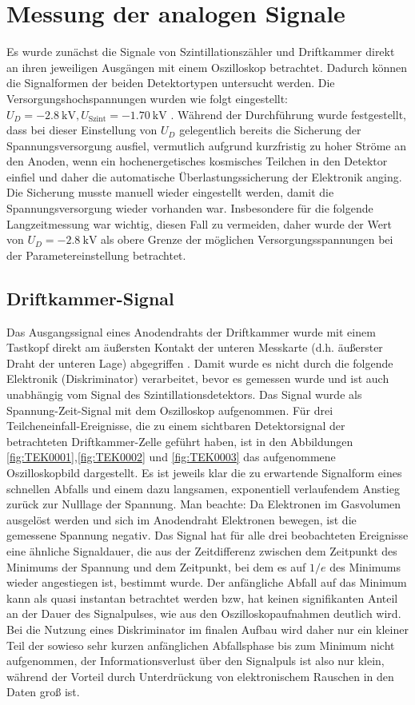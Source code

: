 \chapter{Messung der analogen Signale}\label{sec:analog}

Es wurde zunächst die Signale von Szintillationszähler und Driftkammer direkt an ihren jeweiligen Ausgängen mit einem Oszilloskop betrachtet. Dadurch können die Signalformen der beiden Detektortypen untersucht werden. Die Versorgungshochspannungen wurden wie folgt eingestellt: $U_D=\SI{-2.8}{\kilo\V}, U_\text{Szint}=\SI{-1.70}{\kilo\V}$ \cite[2]{515versuchsanleitung}. Während der Durchführung wurde festgestellt, dass bei dieser Einstellung von $U_D$ gelegentlich bereits die Sicherung der Spannungsversorgung ausfiel, vermutlich aufgrund kurzfristig zu hoher Ströme an den Anoden, wenn ein hochenergetisches kosmisches Teilchen in den Detektor einfiel und daher die automatische Überlastungssicherung der Elektronik anging. Die Sicherung musste manuell wieder eingestellt werden, damit die Spannungsversorgung wieder vorhanden war. Insbesondere für die folgende Langzeitmessung war wichtig, diesen Fall zu vermeiden, daher wurde der Wert von $U_D=\SI{-2.8}{\kilo\V}$ als obere Grenze der möglichen Versorgungsspannungen bei der Parametereinstellung betrachtet.


\section{Driftkammer-Signal}
Das Ausgangssignal eines Anodendrahts der Driftkammer wurde mit einem Tastkopf direkt am äußersten Kontakt der unteren Messkarte (d.h. äußerster Draht der unteren Lage) abgegriffen \cite[2]{515versuchsanleitung}. Damit wurde es nicht durch die folgende Elektronik (Diskriminator) verarbeitet, bevor es gemessen wurde und ist auch unabhängig vom Signal des Szintillationsdetektors. Das Signal wurde als Spannung-Zeit-Signal mit dem Oszilloskop aufgenommen. Für drei Teilcheneinfall-Ereignisse, die zu einem sichtbaren Detektorsignal der betrachteten Driftkammer-Zelle geführt haben, ist in den Abbildungen \ref{fig:TEK0001},\ref{fig:TEK0002} und \ref{fig:TEK0003} das aufgenommene Oszilloskopbild dargestellt. Es ist jeweils klar die zu erwartende Signalform eines schnellen Abfalls und einem dazu langsamen, exponentiell verlaufendem Anstieg zurück zur Nulllage der Spannung. Man beachte: Da Elektronen im Gasvolumen ausgelöst werden und sich im Anodendraht Elektronen bewegen, ist die gemessene Spannung negativ. Das Signal hat für alle drei beobachteten Ereignisse eine ähnliche Signaldauer, die aus der Zeitdifferenz zwischen dem Zeitpunkt des Minimums der Spannung und dem Zeitpunkt, bei dem es auf $1/e$ des Minimums wieder angestiegen ist, bestimmt wurde. Der anfängliche Abfall auf das Minimum kann als quasi instantan betrachtet werden bzw, hat keinen signifikanten Anteil an der Dauer des Signalpulses, wie aus den Oszilloskopaufnahmen deutlich wird. Bei die Nutzung eines Diskriminator im finalen Aufbau wird daher nur ein kleiner Teil der sowieso sehr kurzen anfänglichen Abfallsphase bis zum Minimum nicht aufgenommen, der Informationsverlust über den Signalpuls ist also nur klein, während der Vorteil durch Unterdrückung von elektronischem Rauschen in den Daten groß ist.

